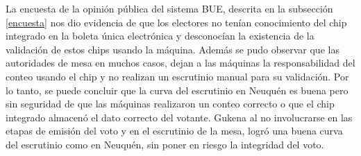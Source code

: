 La encuesta de la opinión pública del sistema BUE, descrita en la subsección \ref{encuesta} nos dio evidencia de que los electores no tenían conocimiento del chip integrado en la boleta única electrónica y desconocían la existencia de la validación de estos chips usando la máquina. 
Además se pudo observar que las autoridades de mesa en muchos casos, dejan a las máquinas la responsabilidad del conteo usando el chip y no realizan un escrutinio manual para su validación.
Por lo tanto, se puede concluir que la curva del escrutinio en Neuquén es buena pero sin seguridad de que las máquinas realizaron un conteo correcto o que el chip integrado almacenó el dato correcto del votante. Gukena al no involucrarse en las etapas de emisión del voto y en el escrutinio de la mesa, logró una buena curva del escrutinio como en Neuquén, sin poner en riesgo la integridad del voto. 
